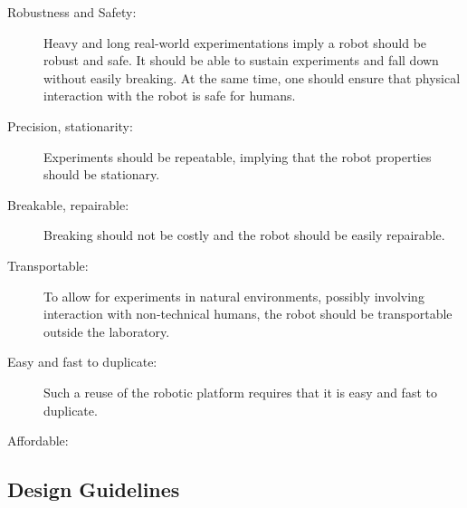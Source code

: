 \begin{description}
    \item[Robustness and Safety:] Heavy and long real-world experimentations imply a robot should be robust and safe. It should be able to sustain experiments and fall down without easily breaking. At the same time, one should ensure that physical interaction with the robot is safe for humans.
    \item [Precision, stationarity:]Experiments should be repeatable, implying that the robot properties should be stationary.
    \item [Breakable, repairable:] Breaking should not be costly and the robot should be easily repairable.
    \item [Transportable:]To allow for experiments in natural environments, possibly involving interaction with non-technical humans, the robot should be transportable outside the laboratory.
    \item [Easy and fast to duplicate:]Such a reuse of the robotic platform requires that it is easy and fast to duplicate.
    \item [Affordable:]
\end{description}


\subsection{Design Guidelines} %

